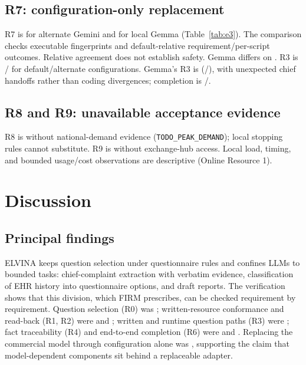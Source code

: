 \subsection{R7: configuration-only replacement}
R7 is \textbf{\EThreeAlternateSwapVerdict{}} for alternate Gemini and
\textbf{\EThreeLocalSwapVerdict{}} for local Gemma
(Table~\ref{tab:e3}). The comparison checks executable fingerprints and default-relative
requirement/per-script outcomes. Relative agreement does not establish safety.
Gemma differs on \EThreeLocalSwapFailingScripts{}.
R3 is \EThreeDefaultRThreeVerdict{}/\EThreeAlternateRThreeVerdict{} for
default/alternate configurations. Gemma's R3 is \EThreeLocalRThreeVerdict{}
(\EThreeGemmaWrittenPathAgree{}/\EThreeGemmaWrittenPathCompared{}), with
\EThreeLocalHandoffs{} unexpected chief handoffs rather than coding divergences;
completion is \EThreeLocalCompleted{}/\EThreeLocalSessions{}.

\begin{table}[t]\centering\footnotesize
\caption{E3 requirement verdicts by configuration. R7 compares each replacement
with the default, including per-script completion, path, and red-flag outcomes;
shared rule gaps do not themselves fail this relative check. Code lines exclude
one-time adapter implementation.}\label{tab:e3}
\setlength{\tabcolsep}{3pt}

\end{table}

\subsection{R8 and R9: unavailable acceptance evidence}
R8 is \textbf{\REightVerdict{}} without national-demand evidence
(\texttt{TODO\_PEAK\_DEMAND}); local stopping rules cannot substitute.
R9 is \textbf{\RNineVerdict{}} without exchange-hub access. Local load,
timing, and bounded usage/cost observations are descriptive (Online Resource 1).

\section{Discussion}\label{sec:discussion}
\subsection{Principal findings}
ELVINA keeps question selection under questionnaire rules and confines LLMs to
bounded tasks: chief-complaint extraction with verbatim evidence, classification
of EHR history into questionnaire options, and draft reports. The verification
shows that this division, which FIRM prescribes, can be checked requirement by
requirement. Question selection (R0) was \RZeroVerdict{}; written-resource
conformance and read-back (R1, R2) were \ROneVerdict{} and \RTwoVerdict{}; written
and runtime question paths (R3) were \RThreeVerdict{}; fact traceability (R4) and
end-to-end completion (R6) were \RFourVerdict{} and \RSixVerdict{}. Replacing the
commercial model through configuration alone was \EThreeAlternateSwapVerdict{},
supporting the claim that model-dependent components sit behind a replaceable
adapter.

